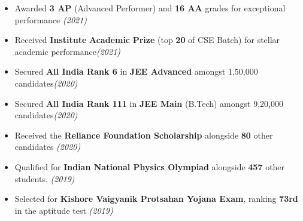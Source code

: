 \begin{itemize}[itemsep = -1.3 mm, leftmargin=*]
\item[\color{Dandelion}\faIcon{trophy}] Awarded {\bf 3 AP} (Advanced Performer) and {\bf 16 AA} grades for exceptional performance \hfill{\sl \small (2021)}
\item[\color{Dandelion}\faIcon{trophy}]  Received {\bf Institute} {\bf Academic} {\bf Prize} (top {\bf 20} of CSE Batch) for stellar academic performance\hfill{\sl \small (2021)}
\item[\color{Dandelion}\faIcon{trophy}]  Secured \textbf{All India Rank 6} in {\bf JEE Advanced} amongst 1,50,000 candidates\hfill{\sl \small (2020)}
\item[\color{Dandelion}\faIcon{trophy}]  Secured \textbf{All India Rank 111} in {\bf JEE Main} (B.Tech) amongst 9,20,000 candidates\hfill{\sl \small (2020)}
\item[\color{Dandelion}\faIcon{trophy}] Received the {\bf Reliance Foundation Scholarship} alongside {\bf 80} other candidates \hfill{\sl \small (2020)}
\item[\color{Dandelion}\faIcon{trophy}] Qualified for {\bf Indian National Physics Olympiad} alongside {\bf 457} other students. \hfill{\sl \small (2019)}
\item[\color{Dandelion}\faIcon{trophy}] Selected for {\bf Kishore Vaigyanik Protsahan Yojana Exam}, ranking {\bf 73rd} in the aptitude test \hfill{\sl \small (2019)}
\end{itemize}